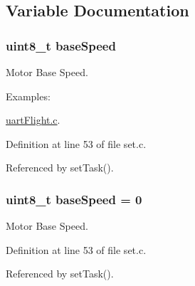 \subsection{Variable Documentation}
\hypertarget{group__set_gab2b0c78a81e045d7a8f28be307b8c61b}{
\subsubsection[{base\-Speed}]{\setlength{\rightskip}{0pt plus 5cm}uint8\-\_\-t base\-Speed}}\label{group__set_gab2b0c78a81e045d7a8f28be307b8c61b}


Motor Base Speed. 

\begin{Desc}
\item[Examples\-: ]\par
\hyperlink{uart_flight_8c-example}{uart\-Flight.\-c}.\end{Desc}


Definition at line 53 of file set.\-c.



Referenced by set\-Task().

\hypertarget{group__set_gab2b0c78a81e045d7a8f28be307b8c61b}{
\subsubsection[{base\-Speed}]{\setlength{\rightskip}{0pt plus 5cm}uint8\-\_\-t base\-Speed = 0}}\label{group__set_gab2b0c78a81e045d7a8f28be307b8c61b}


Motor Base Speed. 



Definition at line 53 of file set.\-c.



Referenced by set\-Task().

